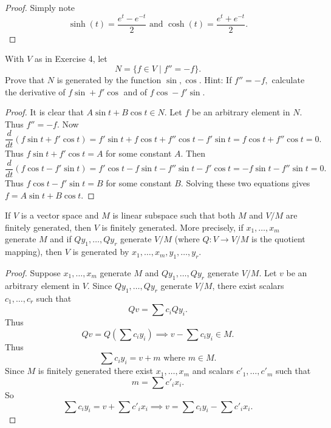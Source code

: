 \begin{proof}
    Simply note 
    \[\sinh(t) = \frac{e^t - e^{-t}}{2} \text{ and } \cosh(t) = \frac{e^t + e^{-t}}{2}.\]
\end{proof}


\begin{tcolorbox}[title=Problem 6, breakable]
    With $V$ as in Exercise 4, let 
    \[N = \{f \in V \mid f'' = -f\}.\]
    Prove that $N$ is generated by the function $\sin, \cos$.
    {Hint: If $f'' = -f,$ calculate the derivative of $f \sin + f' \cos$ 
    and of $f\cos - f'\sin$.}
\end{tcolorbox}

\begin{proof}
    It is clear that $A\sin t + B\cos t \in N$.
    Let $f$ be an arbitrary element in $N$. Thus $f'' = -f$.
    Now
    \[
    \frac{d}{dt}(f \sin t + f' \cos t)
    = f' \sin t + f \cos t + f'' \cos t - f' \sin t
    = f \cos t + f'' \cos t = 0.
    \]
    Thus $f \sin t + f' \cos t = A$ for some constant $A$.
    Then
    \[
    \frac{d}{dt}(f \cos t - f' \sin t)
    = f' \cos t - f \sin t - f'' \sin t - f' \cos t
    = -f \sin t - f'' \sin t = 0.
    \]
    Thus $f \cos t - f' \sin t = B$ for some constant $B$.
    Solving these two equations gives $f = A \sin t + B \cos t$.
\end{proof}

\begin{tcolorbox}[title=Problem 7, breakable]
    If $V$ is a vector space and $M$ is linear subspace 
    such that both $M$ and $V/M$ are finitely generated,
    then $V$ is finitely generated. More precisely,
    if $x_1, \ldots, x_m$ generate $M$ and if 
    $Q y_1, \ldots, Q y_r$ generate $V/M$ (where 
    $Q : V \longrightarrow V/M$ is the quotient mapping),
    then $V$ is generated by $x_1, \ldots, x_m, y_1, \ldots, y_r$.
\end{tcolorbox}

\begin{proof}
    Suppose $x_1, \ldots, x_m$ generate $M$ and 
    $Q y_1, \ldots, Q y_r$ generate $V/M$.
    Let $v$ be an arbitrary element in $V$.
    Since $Qy_1, \ldots, Qy_r$ generate $V/M$, there exist scalars 
    $c_1, \ldots, c_r$ such that 
    \[Qv = \sum c_i Qy_i.\]
    Thus
    \[Qv = Q\left(\sum c_i y_i\right) \implies v - \sum c_i y_i \in M.\]
    Thus 
    \[\sum c_i y_i = v + m \text{ where } m \in M.\]
    Since $M$ is finitely generated there exist 
    $x_1, \ldots, x_m$ and scalars $c'_1, \ldots, c'_m$ such that 
    \[m = \sum c'_i x_i.\]
    So 
    \[\sum c_i y_i = v + \sum c'_i x_i \implies v = \sum c_i y_i - \sum c'_i x_i.\]
\end{proof}

